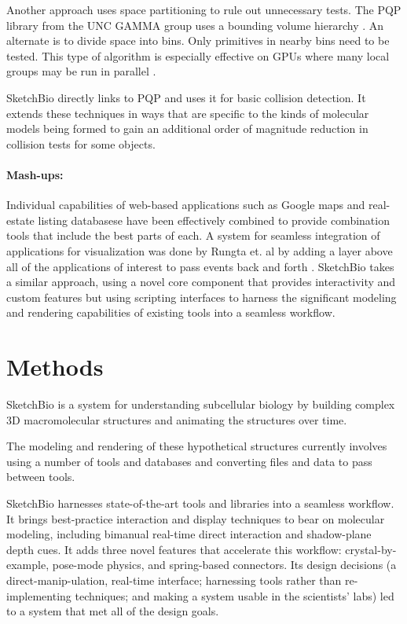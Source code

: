 \documentclass[twocolumn]{bmcart}%
\begin{document}
Another approach uses space partitioning to rule out unnecessary tests.
The PQP library from the UNC GAMMA group uses a bounding volume hierarchy \cite{PQP}.
An alternate is to divide space into bins.
Only primitives in nearby bins need to be tested.
This type of algorithm is especially effective on GPUs where many local groups may be run in parallel \cite{oat2008efficient}.

SketchBio directly links to PQP and uses it for basic collision detection.
It extends these techniques in ways that are specific to the kinds of molecular models being formed to gain an additional order of magnitude reduction in collision tests for some objects.

\paragraph*{Mash-ups:}
Individual capabilities of web-based applications such as Google maps and real-estate listing databasese have been effectively combined to provide combination tools that include the best parts of each.
A system for seamless integration of applications for visualization was done by Rungta et. al by adding a layer above all of the applications of interest to pass events back and forth \cite{rungta2013manyvis}.
SketchBio takes a similar approach, using a novel core component that provides interactivity and custom features but using scripting interfaces to harness the significant modeling and rendering capabilities of existing tools into a seamless workflow.

\section*{Methods}

SketchBio is a system for understanding subcellular biology by building complex 3D macromolecular structures and animating the structures over time.

The modeling and rendering of these hypothetical structures currently involves using a number of tools and databases and converting files and data to pass between tools.

SketchBio harnesses state-of-the-art tools and libraries into a seamless workflow.
It brings best-practice interaction and display techniques to bear on molecular modeling, including bimanual real-time direct interaction and shadow-plane depth cues.
It adds three novel features that accelerate this workflow: crystal-by-example, pose-mode physics, and spring-based connectors.
Its design decisions (a direct-manip-ulation, real-time interface; harnessing tools rather than re-implementing techniques; and making a system usable in the scientists' labs) led to a system that met all of the design goals.
\end{document}
